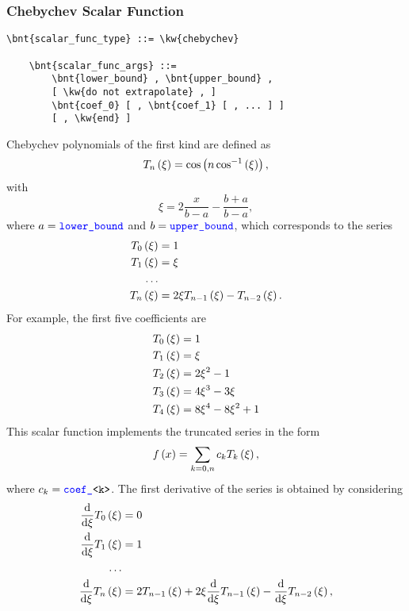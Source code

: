 \subsubsection{Chebychev Scalar Function}
\begin{Verbatim}[commandchars=\\\{\}]
    \bnt{scalar_func_type} ::= \kw{chebychev}

    \bnt{scalar_func_args} ::=
        \bnt{lower_bound} , \bnt{upper_bound} ,
        [ \kw{do not extrapolate} , ]
        \bnt{coef_0} [ , \bnt{coef_1} [ , ... ] ]
        [ , \kw{end} ]
\end{Verbatim}
Chebychev polynomials of the first kind are defined as
\begin{equation}
	T_n\left( \xi \right) = \cos\left( n \cos^{-1}\left( \xi \right) \right) ,
\end{equation}
with
\begin{equation}
	\xi = 2 \frac{x}{b - a} - \frac{b + a}{b - a} ,
\end{equation}
where $a = \textcolor{blue}{\texttt{lower\_bound}}$ and $b = \textcolor{blue}{\texttt{upper\_bound}}$,
which corresponds to the series
\begin{align}
	T_0\left( \xi \right) &= 1 \\
	T_1\left( \xi \right) &= \xi \\
	\ldots \nonumber \\
	T_n\left( \xi \right) &= 2 \xi T_{n-1}\left( \xi \right) - T_{n-2}\left( \xi \right) .
\end{align}
For example, the first five coefficients are
\begin{align}
	T_0\left( \xi \right) &= 1 \\
	T_1\left( \xi \right) &= \xi \\
	T_2\left( \xi \right) &= 2\xi^2 - 1 \\
	T_3\left( \xi \right) &= 4\xi^3 - 3\xi \\
	T_4\left( \xi \right) &= 8\xi^4 - 8\xi^2 + 1
\end{align}
This scalar function implements the truncated series in the form
\begin{equation}
	f\left( x \right) = \sum_{k=0,n} c_k T_k\left( \xi \right) ,
\end{equation}
where $c_k = \textcolor{blue}{\texttt{coef\_}}\texttt{<k>}$.
The first derivative of the series is obtained by considering
\begin{align}
	\frac{\mathrm{d}}{\mathrm{d}\xi}T_0\left( \xi \right) &= 0 \\
	\frac{\mathrm{d}}{\mathrm{d}\xi}T_1\left( \xi \right) &= 1 \\
	\ldots \nonumber \\
	\frac{\mathrm{d}}{\mathrm{d}\xi}T_n\left( \xi \right) &=
		2 T_{n-1}\left( \xi \right)
		+ 2 \xi \frac{\mathrm{d}}{\mathrm{d}\xi}T_{n-1}\left( \xi \right)
		- \frac{\mathrm{d}}{\mathrm{d}\xi}T_{n-2}\left( \xi \right) ,
\end{align}
